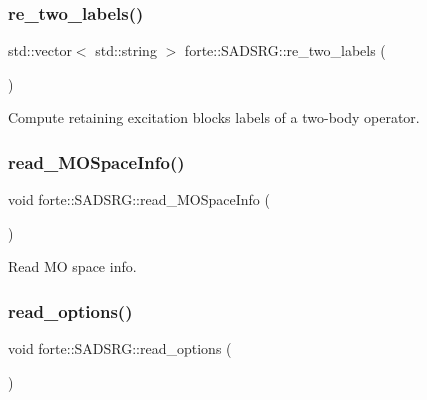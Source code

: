 \subsubsection{\texorpdfstring{re\+\_\+two\+\_\+labels()}{re\_two\_labels()}}
{\footnotesize\ttfamily std\+::vector$<$ std\+::string $>$ forte\+::\+S\+A\+D\+S\+R\+G\+::re\+\_\+two\+\_\+labels (\begin{DoxyParamCaption}{ }\end{DoxyParamCaption})\hspace{0.3cm}{\ttfamily [protected]}}



Compute retaining excitation blocks labels of a two-\/body operator. 

\mbox{\label{classforte_1_1_s_a_d_s_r_g_a6cc199a24d0f57fb35c4f21e9b839b79}} 
\subsubsection{\texorpdfstring{read\+\_\+\+M\+O\+Space\+Info()}{read\_MOSpaceInfo()}}
{\footnotesize\ttfamily void forte\+::\+S\+A\+D\+S\+R\+G\+::read\+\_\+\+M\+O\+Space\+Info (\begin{DoxyParamCaption}{ }\end{DoxyParamCaption})\hspace{0.3cm}{\ttfamily [protected]}}



Read MO space info. 

\mbox{\label{classforte_1_1_s_a_d_s_r_g_ac436b828391e51da6e361dce8982b6f2}} 
\subsubsection{\texorpdfstring{read\+\_\+options()}{read\_options()}}
{\footnotesize\ttfamily void forte\+::\+S\+A\+D\+S\+R\+G\+::read\+\_\+options (\begin{DoxyParamCaption}{ }\end{DoxyParamCaption})\hspace{0.3cm}{\ttfamily [protected]}}




